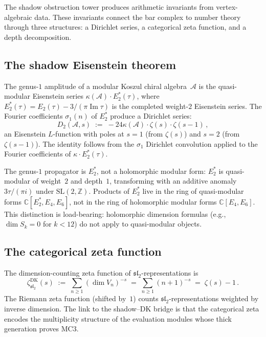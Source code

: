 \documentclass[11pt,reqno]{amsart}
\theoremstyle{definition}
\theoremstyle{remark}
\newcommand{\cA}{\mathcal{A}}
\numberwithin{equation}{section}
\begin{document}
The shadow obstruction tower produces arithmetic invariants
from vertex-algebraic data. These invariants connect the
bar complex to number theory through three structures: a
Dirichlet series, a categorical zeta function, and a depth
decomposition.

\subsection{The shadow Eisenstein theorem}
\label{ssec:eisenstein}

The genus-$1$ amplitude of a modular Koszul chiral
algebra~$\cA$ is the quasi-modular Eisenstein series
$\kappa(\cA) \cdot E_2^*(\tau)$, where
$E_2^*(\tau) = E_2(\tau) - 3/(\pi \operatorname{Im}\tau)$
is the completed weight-$2$ Eisenstein series. The
Fourier coefficients $\sigma_1(n)$ of $E_2^*$ produce
a Dirichlet series:
\begin{equation}\label{eq:dirichlet-series}
D_2(\cA, s)
\;:=\;
-24\kappa(\cA) \cdot
\zeta(s) \cdot \zeta(s - 1)\,,
\end{equation}
an Eisenstein $L$-function with poles at $s = 1$ (from
$\zeta(s)$) and $s = 2$ (from $\zeta(s-1)$). The identity
follows from the $\sigma_1$ Dirichlet convolution applied to
the Fourier coefficients of $\kappa \cdot E_2^*(\tau)$.

The genus-$1$ propagator is $E_2^*$, not a holomorphic
modular form: $E_2^*$ is quasi-modular of weight~$2$ and
depth~$1$, transforming with an additive anomaly
$3\tau/(\pi i)$ under $\mathrm{SL}(2,\mathbb{Z})$.
Products of $E_2^*$ live in the ring of quasi-modular
forms $\mathbb{C}[E_2^*, E_4, E_6]$, not in the ring of
holomorphic modular forms $\mathbb{C}[E_4, E_6]$. This
distinction is load-bearing: holomorphic dimension formulas
(e.g., $\dim S_k = 0$ for $k < 12$) do not apply to
quasi-modular objects.


\subsection{The categorical zeta function}
\label{ssec:categorical-zeta}

The dimension-counting zeta function of
$\mathfrak{sl}_2$-representations is
\begin{equation}\label{eq:cat-zeta}
\zeta^{\mathrm{DK}}_{\mathfrak{sl}_2}(s)
\;:=\;
\sum_{n \ge 1} (\dim V_n)^{-s}
\;=\;
\sum_{n \ge 1}(n+1)^{-s}
\;=\;
\zeta(s) - 1\,.
\end{equation}
The Riemann zeta function (shifted by~$1$) counts
$\mathfrak{sl}_2$-representations weighted by inverse
dimension. The link to the shadow--DK bridge is that
the categorical zeta encodes the multiplicity structure
of the evaluation modules whose thick generation proves
MC3.
\end{document}
